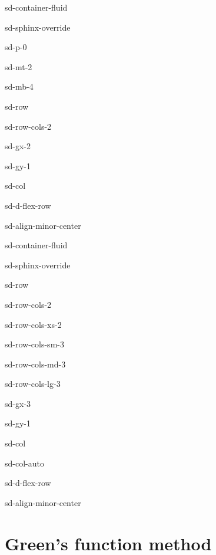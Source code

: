 \documentclass[letterpaper,10pt,italian]{jupyterBook}
\begin{document}
\begin{sphinxuseclass}{sd-container-fluid}
\begin{sphinxuseclass}{sd-sphinx-override}
\begin{sphinxuseclass}{sd-p-0}
\begin{sphinxuseclass}{sd-mt-2}
\begin{sphinxuseclass}{sd-mb-4}
\begin{sphinxuseclass}{sd-row}
\begin{sphinxuseclass}{sd-row-cols-2}
\begin{sphinxuseclass}{sd-gx-2}
\begin{sphinxuseclass}{sd-gy-1}
\begin{sphinxuseclass}{sd-col}
\begin{sphinxuseclass}{sd-d-flex-row}
\begin{sphinxuseclass}{sd-align-minor-center}
\begin{sphinxuseclass}{sd-container-fluid}
\begin{sphinxuseclass}{sd-sphinx-override}
\begin{sphinxuseclass}{sd-row}
\begin{sphinxuseclass}{sd-row-cols-2}
\begin{sphinxuseclass}{sd-row-cols-xs-2}
\begin{sphinxuseclass}{sd-row-cols-sm-3}
\begin{sphinxuseclass}{sd-row-cols-md-3}
\begin{sphinxuseclass}{sd-row-cols-lg-3}
\begin{sphinxuseclass}{sd-gx-3}
\begin{sphinxuseclass}{sd-gy-1}
\begin{sphinxuseclass}{sd-col}
\begin{sphinxuseclass}{sd-col-auto}
\begin{sphinxuseclass}{sd-d-flex-row}
\begin{sphinxuseclass}{sd-align-minor-center}
\end{sphinxuseclass}
\end{sphinxuseclass}
\end{sphinxuseclass}
\end{sphinxuseclass}
\end{sphinxuseclass}
\end{sphinxuseclass}
\end{sphinxuseclass}
\end{sphinxuseclass}
\end{sphinxuseclass}
\end{sphinxuseclass}
\end{sphinxuseclass}
\end{sphinxuseclass}
\end{sphinxuseclass}
\end{sphinxuseclass}
\end{sphinxuseclass}
\end{sphinxuseclass}
\end{sphinxuseclass}
\end{sphinxuseclass}
\end{sphinxuseclass}
\end{sphinxuseclass}
\end{sphinxuseclass}
\end{sphinxuseclass}
\end{sphinxuseclass}
\end{sphinxuseclass}
\end{sphinxuseclass}
\end{sphinxuseclass}

\chapter{Green’s function method}
\label{\detokenize{ch/green-function:green-s-function-method}}\label{\detokenize{ch/green-function:classical-electromagnetism-green-function}}\label{\detokenize{ch/green-function::doc}}
\end{document}
